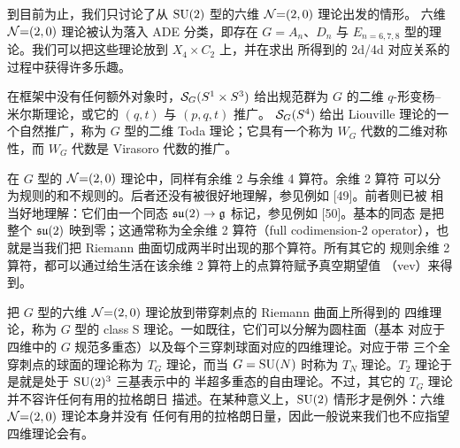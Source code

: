 到目前为止，我们只讨论了从 $\mathrm{SU}(2)$ 型的六维 $\mathcal{N}{=}(2,0)$ 理论出发的情形。
六维 $\mathcal{N}{=}(2,0)$ 理论被认为落入 ADE 分类，即存在 $G=A_n$、$D_n$ 与
$E_{n=6,7,8}$ 型的理论。我们可以把这些理论放到 $X_4\times C_2$ 上，并在求出
所得到的 2d/4d 对应关系的过程中获得许多乐趣。

在框架中没有任何额外对象时，$\mathcal{S}_G(S^1\times S^3)$ 给出规范群为 $G$
的二维 $q$-形变杨--米尔斯理论，或它的 $(q,t)$ 与 $(p,q,t)$ 推广。
$\mathcal{S}_G(S^4)$ 给出 Liouville 理论的一个自然推广，称为 $G$ 型的二维
Toda 理论；它具有一个称为 $W_G$ 代数的二维对称性，而 $W_G$ 代数是 Virasoro
代数的推广。


在 $G$ 型的 $\mathcal{N}{=}(2,0)$ 理论中，同样有余维 2 与余维 4 算符。余维 2 算符
可以分为规则的和不规则的。后者还没有被很好地理解，参见例如 [49]。前者则已被
相当好地理解：它们由一个同态 $\mathfrak{su}(2)\to\mathfrak{g}$ 标记，参见例如 [50]。基本的同态
是把整个 $\mathfrak{su}(2)$ 映到零；这通常称为全余维 2 算符（full codimension-2
operator），也就是当我们把 Riemann 曲面切成两半时出现的那个算符。所有其它的
规则余维 2 算符，都可以通过给生活在该余维 2 算符上的点算符赋予真空期望值
（vev）来得到。


把 $G$ 型的六维 $\mathcal{N}{=}(2,0)$ 理论放到带穿刺点的 Riemann 曲面上所得到的
四维理论，称为 $G$ 型的 class S 理论。一如既往，它们可以分解为圆柱面（基本
对应于四维中的 $G$ 规范多重态）以及每个三穿刺球面对应的四维理论。对应于带
三个全穿刺点的球面的理论称为 $T_G$ 理论，而当%
$G=\mathrm{SU}(N)$ 时称为 $T_N$ 理论。$T_2$ 理论于是就是处于 $\mathrm{SU}(2)^3$ 三基表示中的
半超多重态的自由理论。不过，其它的 $T_G$ 理论并不容许任何有用的拉格朗日
描述。在某种意义上，$\mathrm{SU}(2)$ 情形才是例外：六维 $\mathcal{N}{=}(2,0)$ 理论本身并没有
任何有用的拉格朗日量，因此一般说来我们也不应指望四维理论会有。

